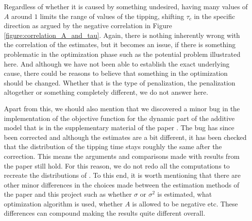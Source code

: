 Regardless of whether it is caused by something undesired, having many values of $A$ around $1$ limits the range of values of the tipping, shifting $\tau_c$ in the specific direction as argued by the negative correlation in Figure \ref{figure:correlation_A_and_tau}. Again, there is nothing inherently wrong with the correlation of the estimates, but it becomes an issue, if there is something problematic in the optimization phase such as the potential problem illustrated here. And although we have not been able to establish the exact underlying cause, there could be reasons to believe that something in the optimization should be changed. Whether that is the type of penalization, the penalization altogether or something completely different, we do not answer here.

Apart from this, we should also mention that we discovered a minor bug in the implementation of the objective function for the dynamic part of the additive model that is in the supplementary material of the paper \cite{DitlevsenSupplementary}. The bug has since been corrected and although the estimates are a bit different, it has been checked that the distribution of the tipping time stays roughly the same after the correction. This means the arguments and comparisons made with results from the paper still hold. For this reason, we do not redo all the computations to recreate the distributions of \cite{Ditlevsen2023}. To this end, it is worth mentioning that there are other minor differences in the choices made between the estimation methods of the paper and this project such as whether $\sigma$ or $\sigma^2$ is estimated, what optimization algorithm is used, whether $A$ is allowed to be negative etc.
These differences can compound making the results quite different overall. 

